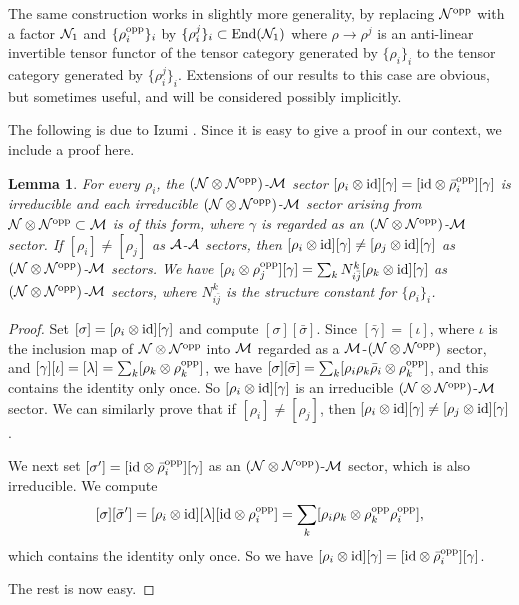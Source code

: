 \documentclass[12pt]{article}
\def\id{{\rm id}}
\def\o{{\rm opp}}
\def\ga{\gamma}
\def\si{\sigma}
\newtheorem{lemma}[theorem]{Lemma}
\def\A{{\cal A}}
\def\N{{\cal N}}
\def\M{{\cal M}}
\begin{document}
The same construction works in slightly more generality,
by replacing $\N^\o$ with a factor $\N_1$ and
$\{\rho_i^\o\}_i$ by $\{\rho^j_i\}_i\subset\textnormal{End}(\N_1)$
where $\rho\to\rho^j$ is an
anti-linear invertible tensor functor of the tensor category
generated by $\{\rho_i\}_i$ to the tensor category generated by
$\{\rho_i^j\}_i$. Extensions of our results to this case are obvious,
but sometimes useful, and will be considered possibly implicitly.

The following is due to Izumi \cite{I4}. Since it is easy
to give a proof in our context, we include a proof here.

\begin{lemma}
\label{LL11}
For every $\rho_i$, the $(\N\otimes\N^\o)$-$\M$ sector
$[\rho_i\otimes\id][\ga]
=[\id\otimes\bar\rho_i^\o][\ga]$ is irreducible
and each irreducible
$(\N\otimes\N^\o)$-$\M$ sector arising from $\N\otimes\N^\o\subset
\M$
is of this form,
where $\ga$ is regarded as an $(\N\otimes\N^\o)$-$\M$ sector.
If $[\rho_i]\neq[\rho_j]$ as $\A$-$\A$ sectors, then
$[\rho_i\otimes\id][\ga]\neq [\rho_j\otimes\id][\ga]$ as
$(\N\otimes\N^\o)$-$\M$ sectors.
We have $[\rho_i\otimes\rho_j^\o][\ga]=
\sum_k N_{i\bar j}^k [\rho_k\otimes\id][\ga]$ as
$(\N\otimes\N^\o)$-$\M$ sectors,
where $N_{i\bar j}^k$ is the structure constant for $\{\rho_i\}_i$.
\end{lemma}

\begin{proof}
Set $[\si]=[\rho_i\otimes\id][\ga]$ and compute $[\si][\bar \si]$.
Since $[\bar\ga]=[\iota]$, where $\iota$ is the inclusion map
of $\N\otimes\N^\o$ into $\M$ regarded as a $\M$-$(\N\otimes\N^\o)$
sector, and $[\ga][\iota]=[\lambda]=\sum_k [\rho_k\otimes\rho^\o_k]$, we
have
$[\si][\bar\si]=\sum_k [\rho_i \rho_k \bar\rho_i\otimes\rho_k^\o]$,
and this contains the identity only once.
So $[\rho_i\otimes\id][\ga]$  is an irreducible
$(\N\otimes\N^\o)$-$\M$ sector.
We can similarly prove that if $[\rho_i]\neq[\rho_j]$, then
$[\rho_i\otimes\id][\ga]\neq [\rho_j\otimes\id][\ga]$.

We next set $[\si']=[\id\otimes\bar\rho_i^\o][\ga]$  as
an $(\N\otimes\N^\o)$-$\M$ sector, which is also irreducible.  We
compute
$$[\si][\bar\si']=
[\rho_i\otimes\id][\lambda] [\id\otimes\rho_i^\o]=
\sum_k [\rho_i \rho_k \otimes\rho_k^\o\rho_i^\o],$$
which contains the identity only once.
So we have $[\rho_i\otimes\id][\ga]
=[\id\otimes\bar\rho_i^\o][\ga]$.

The rest is now easy.
\end{proof}
\end{document}

